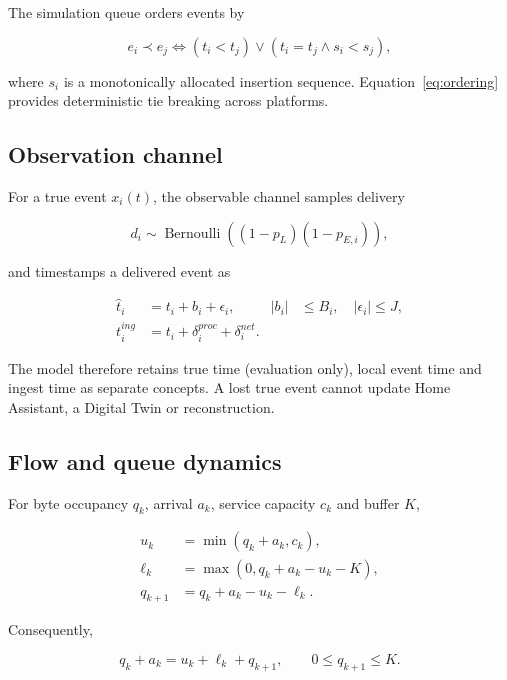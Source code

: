 ﻿\documentclass[10pt,a4paper,twocolumn]{article}
\begin{document}
The simulation queue orders events by

\begin{equation}
e_i\prec e_j\iff(t_i<t_j)\lor(t_i=t_j\land s_i<s_j),
\label{eq:ordering}
\end{equation}

where \(s_i\) is a monotonically allocated insertion sequence. Equation~\eqref{eq:ordering} provides deterministic tie breaking across platforms.

\subsection{Observation channel}

For a true event \(x_i(t)\), the observable channel samples delivery

\begin{equation}
d_i\sim\operatorname{Bernoulli}\left((1-p_L)(1-p_{E,i})\right),
\end{equation}

and timestamps a delivered event as

\begin{align}
\hat t_i &=t_i+b_i+\epsilon_i, & |b_i|&\le B_i,\quad |\epsilon_i|\le J,\\
t_i^{ing}&=t_i+\delta_i^{proc}+\delta_i^{net}.&&
\end{align}

The model therefore retains true time (evaluation only), local event time and ingest time as separate concepts. A lost true event cannot update Home Assistant, a Digital Twin or reconstruction.

\subsection{Flow and queue dynamics}

For byte occupancy \(q_k\), arrival \(a_k\), service capacity \(c_k\) and buffer \(K\),

\begin{align}
u_k&=\min(q_k+a_k,c_k),\\
\ell_k&=\max(0,q_k+a_k-u_k-K),\\
q_{k+1}&=q_k+a_k-u_k-\ell_k.
\label{eq:queue}
\end{align}

Consequently,

\begin{equation}
q_k+a_k=u_k+\ell_k+q_{k+1},\qquad 0\le q_{k+1}\le K.
\end{equation}
\end{document}
